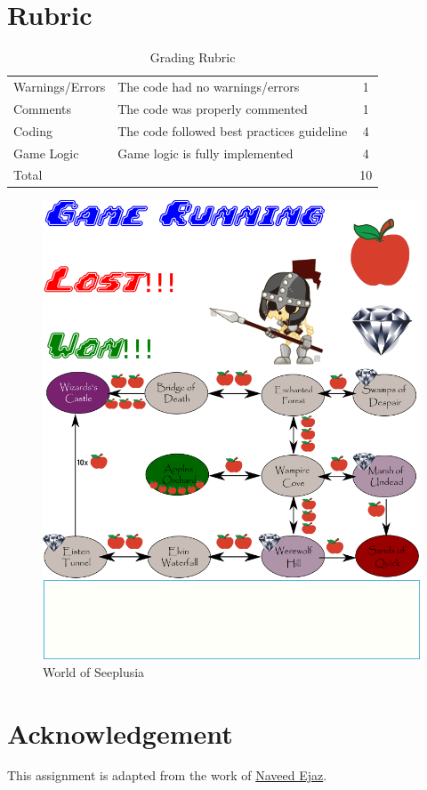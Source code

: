 \documentclass[a4paper,12pt]{article}
\begin{document}
\section{Rubric}
\begin{table}[h]
	\centering
	\begin{tabular}{llc}
		\toprule
		Warnings/Errors & The code had no warnings/errors            & 1  \\
		Comments        & The code was properly commented            & 1  \\
		Coding          & The code followed best practices guideline & 4  \\
		Game Logic      & Game logic is fully implemented            & 4  \\
		\midrule
		Total           &                                            & 10 \\
		\bottomrule
	\end{tabular}
	\caption{Grading Rubric}
	\label{Grading}
\end{table}


\begin{figure}
	\centering
	\includegraphics[trim={0 0 0 9cm},clip, width=1\linewidth]{Seeplusia/assests}
	\caption{World of Seeplusia}
	\label{fig:assests}
\end{figure}

\section{Acknowledgement}
This assignment is adapted from the work of  \href{https://twitter.com/nav_ejaz}{Naveed Ejaz}.
\end{document}
